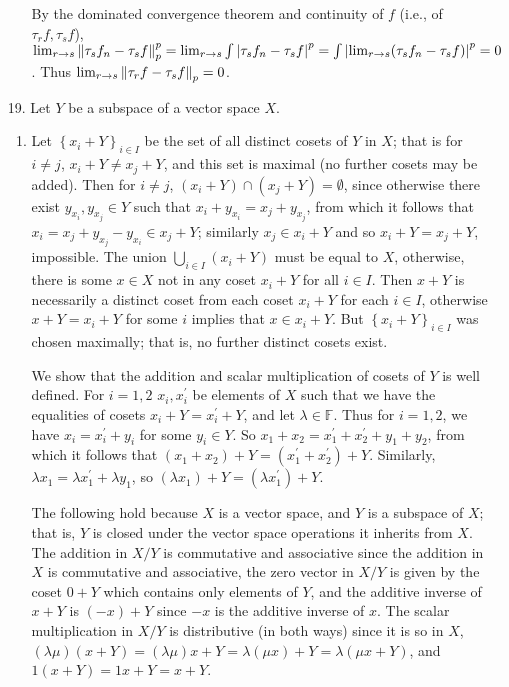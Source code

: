 \documentclass[11pt,leqno]{article}
\theoremstyle{plain}
\theoremstyle{definition}
\numberwithin{equation}{section}
\numberwithin{lem}{section}
\newcommand{\cbr}[1]{\left\{#1\right\}}
\begin{document}
\begin{enumerate}
\begin{enumerate}
    By the dominated convergence theorem and continuity of $f$ (i.e., of $\tau_rf,\tau_sf$), $\lim_{r\to s} \norm{\tau_sf_n - \tau_s f}_p^p = \lim_{r\to s} \int \abs{\tau_sf_n - \tau_s f}^p = \int \abs{\lim_{r\to s}(\tau_sf_n - \tau_s f)}^p = 0$. Thus $\lim_{r\to s}\norm{\tau_rf - \tau_s f}_p = 0$.
  \end{enumerate}
  
  \item[19.] Let $Y$ be a subspace of a vector space $X$.
  \begin{enumerate}
    \item Let $\cbr{x_i + Y}_{i\in I}$ be the set of all distinct cosets of $Y$ in $X$; that is for $i\neq j$, $x_i+ Y\neq x_j + Y$, and this set is maximal (no further cosets may be added). Then for $i\neq j$, $(x_i + Y)\cap (x_j + Y) = \emptyset$, since otherwise there exist $y_{x_i},y_{x_j}\in Y$ such that $x_i + y_{x_i} = x_j + y_{x_j}$, from which it follows that $x_i = x_j + y_{x_j} - y_{x_i}\in x_j + Y$; similarly $x_j\in x_i + Y$ and so $x_i+ Y = x_j + Y$, impossible. The union $\bigcup_{i\in I}(x_i + Y)$ must be equal to $X$, otherwise, there is some $x\in X$ not in any coset $x_i + Y$ for all $i\in I$. Then $x + Y$ is necessarily a distinct coset from each coset $x_i + Y$ for each $i\in I$, otherwise $x +Y = x_i+Y$ for some $i$ implies that $x\in x_i + Y$. But $\cbr{x_i + Y}_{i\in I}$ was chosen maximally; that is, no further distinct cosets exist.
    
    We show that the addition and scalar multiplication of cosets of $Y$ is well defined. For $i = 1,2$ $x_i,x_i^\prime$ be elements of $X$ such that we have the equalities of cosets $x_i + Y = x_i^\prime + Y$, and let $\lambda \in \mathbb F$. Thus for $i = 1,2$, we have $x_i = x_i^\prime + y_i$ for some $y_i\in Y$. So $x_1 + x_2 = x_1^\prime + x_2^\prime + y_1 + y_2$, from which it follows that $(x_1 + x_2) + Y = (x_1^\prime + x_2^\prime) + Y$. Similarly, $\lambda x_1 = \lambda x_1^\prime + \lambda y_1$, so $(\lambda x_1) + Y = (\lambda x_1^\prime) + Y$.

    The following hold because $X$ is a vector space, and $Y$ is a subspace of $X$; that is, $Y$ is closed under the vector space operations it inherits from $X$. The addition in $X/Y$ is commutative and associative since the addition in $X$ is commutative and associative, the zero vector in $X/Y$ is given by the coset $0 + Y$ which contains only elements of $Y$, and the additive inverse of $x+Y$ is $(-x) + Y$ since $-x$ is the additive inverse of $x$. The scalar multiplication in $X/Y$ is distributive (in both ways) since it is so in $X$, $(\lambda\mu)(x+Y) = (\lambda\mu)x + Y = \lambda(\mu x) + Y = \lambda (\mu x + Y)$, and $1(x+Y) = 1x+Y = x+Y$.


\end{enumerate}
\end{enumerate}
\end{document}
